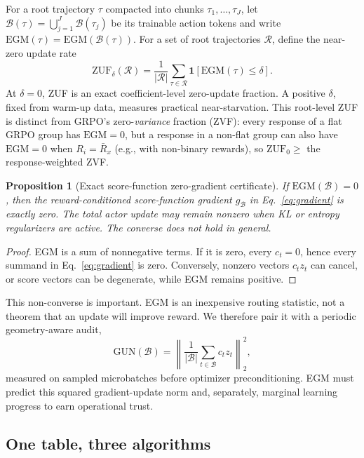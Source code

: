 \documentclass{article}
\newtheorem{proposition}{Proposition}
\newcommand{\egm}{\mathrm{EGM}}
\newcommand{\zuf}{\mathrm{ZUF}}
\newcommand{\ind}{\mathbf{1}}
\begin{document}
For a root trajectory $\tau$ compacted into chunks $\tau_1,\ldots,\tau_J$, let
$\mathcal{B}(\tau)=\bigcup_{j=1}^{J}\mathcal{B}(\tau_j)$ be its trainable action
tokens and write $\egm(\tau)=\egm(\mathcal{B}(\tau))$.  For a set of root
trajectories $\mathcal{R}$, define the near-zero update rate
\begin{equation}
  \zuf_{\delta}(\mathcal{R})=
  \frac{1}{|\mathcal{R}|}\sum_{\tau\in\mathcal{R}}
  \ind\!\left[\egm(\tau)\leq\delta\right].
  \label{eq:zuf}
\end{equation}
At $\delta=0$, ZUF is an exact coefficient-level zero-update fraction.  A
positive $\delta$, fixed from warm-up data, measures practical near-starvation.
This root-level ZUF is distinct from GRPO's zero-\emph{variance} fraction
(ZVF): every response of a flat GRPO group has $\egm=0$, but a response
in a non-flat group can also have $\egm=0$ when $R_i=\bar R_x$ (e.g., with
non-binary rewards), so $\zuf_0\ge$ the response-weighted ZVF.

\begin{proposition}[Exact score-function zero-gradient certificate]
If $\egm(\mathcal{B})=0$, then the reward-conditioned score-function gradient
$g_{\mathcal{B}}$ in Eq.~\eqref{eq:gradient} is exactly zero.  The total actor
update may remain nonzero when KL or entropy regularizers are active.
The converse does not hold in general.
\end{proposition}
\begin{proof}
EGM is a sum of nonnegative terms.  If it is zero, every $c_t=0$, hence every
summand in Eq.~\eqref{eq:gradient} is zero.  Conversely, nonzero vectors
$c_tz_t$ can cancel, or score vectors can be degenerate, while EGM remains
positive.
\end{proof}

This non-converse is important.  EGM is an inexpensive routing statistic, not
a theorem that an update will improve reward.  We therefore pair it with a
periodic geometry-aware audit,
\begin{equation}
  \mathrm{GUN}(\mathcal{B})=\left\|
  \frac{1}{|\mathcal{B}|}\sum_{t\in\mathcal{B}} c_tz_t\right\|_2^2,
  \label{eq:gun}
\end{equation}
measured on sampled microbatches before optimizer preconditioning.  EGM must
predict this squared gradient-update norm and, separately, marginal learning progress
to earn operational trust.

\subsection{One table, three algorithms}
\end{document}
